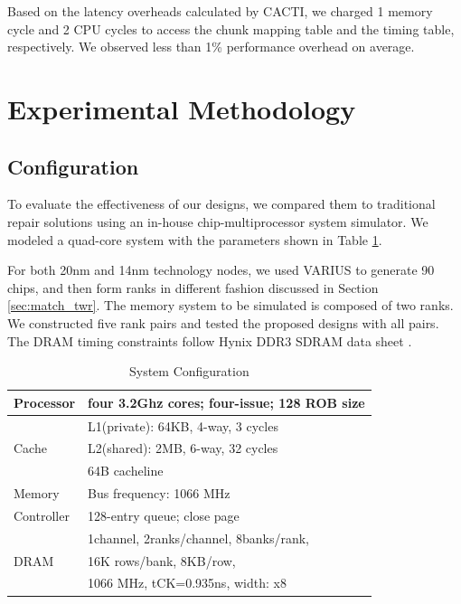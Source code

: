 Based on the latency overheads calculated by CACTI, we charged 1 memory cycle and 2 CPU cycles to access the chunk mapping table and the timing table, respectively. We observed less than 1\% performance overhead on average. 

\section{Experimental Methodology}
\subsection{Configuration}
To evaluate the effectiveness of our designs, we compared them to traditional repair solutions using an in-house chip-multiprocessor system simulator. We modeled a quad-core system with the parameters shown in Table \ref{tab:configuration}. 

For both 20nm and 14nm technology nodes, we used VARIUS to generate 90 chips, and then form ranks in different fashion discussed in Section \ref{sec:match_twr}. The memory system to be simulated is composed of two ranks. We constructed five rank pairs and tested the proposed designs with all pairs.
The DRAM timing constraints follow Hynix DDR3 SDRAM data sheet \cite{hynix:ddr3}. 

\begin{table}[htbp]
\centering
\caption{System Configuration}
\vspace{-0.25in}
\scalebox{0.85}
{
\begin{tabular}{l|l}
\hline\hline
Processor				&four 3.2Ghz cores; four-issue; 128 ROB size\\
\hline
				&L1(private): 64KB, 4-way, 3 cycles\\
Cache			&L2(shared): 2MB, 6-way, 32 cycles\\
				&64B cacheline\\
\hline
Memory				&Bus frequency: 1066 MHz\\
Controller 	& 128-entry queue; close page\\
\hline
			&1channel, 2ranks/channel, 8banks/rank, \\
DRAM				&16K rows/bank, 8KB/row,\\
				&1066 MHz, tCK=0.935ns, width: x8\\
\hline\hline

\end{tabular}
}
\label{tab:configuration}
\end{table}

